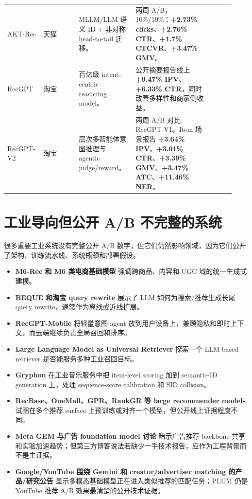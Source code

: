 \documentclass[UTF8,fontset=fandol,11pt]{ctexart}
\newcommand{\metric}[1]{\textbf{#1}}
\begin{document}
\begin{longtable}{@{}p{0.12\linewidth}p{0.15\linewidth}p{0.24\linewidth}p{0.32\linewidth}p{0.10\linewidth}@{}}
AKT-Rec & 天猫 & MLLM/LLM 语义 ID + 非对称 head-to-tail 迁移。 & 两周 A/B，10\%/10\%：\metric{+2.73\% clicks}、\metric{+2.76\% CTR}、\metric{+1.7\% CTCVR}、\metric{+3.47\% GMV}。 & \cite{aktrec}\\
RecGPT & 淘宝 & 百亿级 intent-centric reasoning model。 & 公开摘要报告线上 \metric{+9.47\% IPV}、\metric{+6.33\% CTR}，同时改善多样性和商家侧收益。 & \cite{recgpt}\\
RecGPT-V2 & 淘宝 & 层次多智能体意图推理与 agentic judge/reward。 & 两周 A/B 对比 RecGPT-V1。Item 场景报告 \metric{+3.64\% IPV}、\metric{+3.01\% CTR}、\metric{+3.39\% GMV}、\metric{+3.47\% ATC}、\metric{+11.46\% NER}。 & \cite{recgptv2}\\
\bottomrule
\end{longtable}
\normalsize

\section{工业导向但公开 A/B 不完整的系统}

很多重要工业系统没有完整公开 A/B 数字，但它们仍然影响领域，因为它们公开了架构、训练流水线、系统瓶颈和部署假设。

\begin{itemize}
  \item \textbf{M6-Rec 和 M6 类电商基础模型} 强调跨商品、内容和 UGC 域的统一生成式建模。
  \item \textbf{BEQUE 和淘宝 query rewrite} 展示了 LLM 如何为搜索/推荐生成长尾 query rewrite，通常作为离线或近线扩展。
  \item \textbf{RecGPT-Mobile} 将轻量意图 agent 放到用户设备上，兼顾隐私和即时上下文，而云端继续负责全局召回和排序。
  \item \textbf{Large Language Model as Universal Retriever} 探索一个 LLM-based retriever 是否能服务多种工业召回目标。
  \item \textbf{Gryphon} 在工业音乐服务中把 item-level scoring 加到 semantic-ID generation 上，处理 sequence-score calibration 和 SID collision。
  \item \textbf{RecBase、OneMall、GPR、RankGR 等 large recommender models} 试图在多个推荐 surface 上预训练或对齐一个模型，但公开线上证据程度不同。
  \item \textbf{Meta GEM 与广告 foundation model 讨论} 暗示广告推荐 backbone 共享和实验加速趋势；但第三方博客说法若缺少一手技术报告，应作为工程背景而不是主证据。
  \item \textbf{Google/YouTube 围绕 Gemini 和 creator/advertiser matching 的产品/研究公告} 显示多模态基础模型正在进入类似推荐的匹配任务；PLUM 仍是 YouTube 推荐 A/B 效果最清楚的公开技术证据。
\end{itemize}
\end{document}
